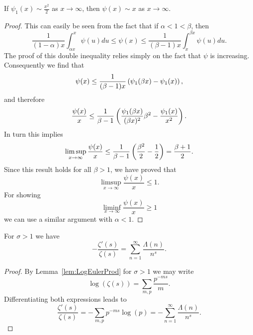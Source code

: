 \begin{lemma}
	If $\psi_1(x) \sim \frac{x^2}{2}$ as $x \to \infty$, then $\psi(x) \sim x$ as $x \to \infty$.
\end{lemma}
\begin{proof}
	This can easily be seen from the fact that if $\alpha < 1 < \beta$, then
\begin{equation*}
	\frac{1}{(1 - \alpha) x} \int _{\alpha x} ^x \psi(u) du \leq \psi(x) \leq \frac{1}{(\beta - 1) x} \int _{x} ^{\beta x} \psi(u) du.
\end{equation*}
	The proof of this double inequality relies simply on the fact that $\psi$ is increasing. Consequently we find that
\begin{equation*}
	\psi(x) \leq \frac{1}{(\beta - 1)x} \left(\psi_1(\beta x) - \psi_1(x)\right),
\end{equation*}
	and therefore
\begin{equation*}
	\frac{\psi(x)}{x} \leq \frac{1}{\beta - 1} \left(\frac{\psi_1(\beta x)}{(\beta x)^2} \beta^2 - \frac{\psi_1(x)}{x^2}\right).
\end{equation*}
	In turn this implies
\begin{equation*}
	\limsup _{x \to \infty} \frac{\psi(x)}{x} \leq \frac{1}{\beta - 1} \left(\frac{\beta^2}{2} - \frac{1}{2}\right) = \frac{\beta + 1}{2}.
\end{equation*}
	Since this result holds for all $\beta > 1$, we have proved that
\begin{equation*}
	\limsup _{x \to \infty} \frac{\psi(x)}{x} \leq 1. 
\end{equation*}
	For showing
\begin{equation*}
	\liminf _{x \to \infty} \frac{\psi(x)}{x} \geq 1
\end{equation*}
	we can use a similar argument with $\alpha < 1$.
\end{proof}


\begin{lemma}
	For $\sigma > 1$ we have
\begin{equation*}
	-\frac{\zeta'(s)}{\zeta(s)} = \sum _{n = 1} ^\infty \frac{\Lambda(n)}{n^s}.
\end{equation*}
\end{lemma}
\begin{proof}
	By Lemma~\ref{lem:LogEulerProd} for $\sigma > 1$ we may write
\begin{equation*}
	\log(\zeta(s)) = \sum _{m,p} \frac{p^{-ms}}{m}.
\end{equation*}
	Differentiating both expressions leads to
\begin{equation*}
	\frac{\zeta'(s)}{\zeta(s)} = -\sum _{m,p} p^{-ms} \log(p) = -\sum _{n = 1} ^\infty \frac{\Lambda(n)}{n^s}.
\end{equation*}
\end{proof}


